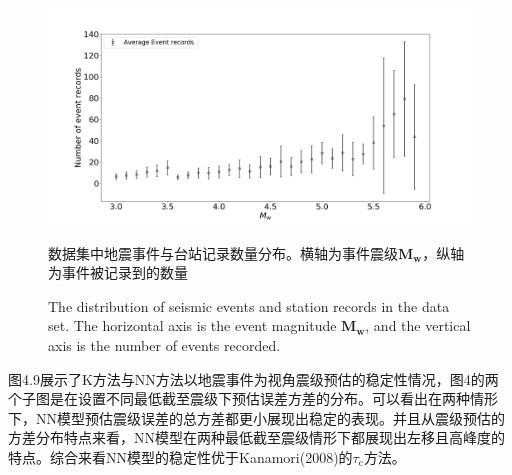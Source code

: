 \begin{figure}[!h] 
\centering 
\includegraphics[width=\linewidth]{img/M-N.png} 
\renewcommand{\figurename}{图} 
\caption{数据集中地震事件与台站记录数量分布。横轴为事件震级$\mathbf{M}_{\mathbf{w}}$，纵轴为事件被记录到的数量} 
\addtocounter{figure}{-1} \vspace{-5pt} 
\renewcommand{\figurename}{Fig} 
\caption{The distribution of seismic events and station records in the data set. The horizontal axis is the event magnitude $\mathbf{M}_{\mathbf{w}}$, and the vertical axis is the number of events recorded.} 
\renewcommand{\figurename}{图} 
\label{fig:network-device-influence.png} 
\end{figure}
\indent 图4.9展示了K方法与NN方法以地震事件为视角震级预估的稳定性情况，图4的两个子图是在设置不同最低截至震级下预估误差方差的分布。可以看出在两种情形下，NN模型预估震级误差的总方差都更小展现出稳定的表现。并且从震级预估的方差分布特点来看，NN模型在两种最低截至震级情形下都展现出左移且高峰度的特点。综合来看NN模型的稳定性优于Kanamori(2008)的$\tau_{\mathrm{c}}$方法。\\

